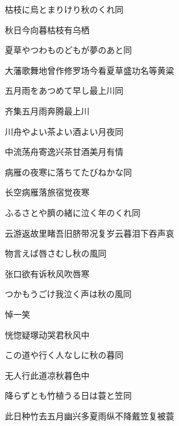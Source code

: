 \begin{haiku}
    {\FH 枯枝に烏とまりけり秋のくれ}\hfill{\FH 同}

    {\FK 秋日今向暮枯枝有乌栖}
\end{haiku}

\begin{haiku}
    {\FH 夏草やつわものどもが夢のあと}\hfill{\FH 同}

    {\FK 大藩歌舞地曾作修罗场今看夏草盛功名等黄粱}
\end{haiku}

\begin{haiku}
    {\FH 五月雨をあつめて早し最上川}\hfill{\FH 同}

    {\FK 齐集五月雨奔腾最上川}
\end{haiku}

\begin{haiku}
    {\FH 川舟やよい茶よい酒よい月夜}\hfill{\FH 同}

    {\FK 中流荡舟寄逸兴茶甘酒美月有情}
\end{haiku}

\begin{haiku}
    {\FH 病雁の夜寒に落ちてたびねかな}\hfill{\FH 同}

    {\FK 长空病雁落旅宿觉夜寒}
\end{haiku}

\begin{haiku}
    {\FH ふるさとや臍の緒に泣く年のくれ}\hfill{\FH 同}

    {\FK 云游返故里睹吾旧脐带况复岁云暮泪下吞声哀}
\end{haiku}

\begin{haiku}
    {\FH 物言えば唇さむし秋の風}\hfill{\FH 同}

    {\FK 张口欲有诉秋风吹唇寒}
\end{haiku}

\begin{haiku}
    {\FH つかもうごけ我泣く声は秋の風}\hfill{\FH 同}

    {\FK 悼一笑}

    {\FK 恍惚疑塚动哭君秋风中}
\end{haiku}

\begin{haiku}
    {\FH この道や行く人なしに秋の暮}\hfill{\FH 同}

    {\FK 无人行此道凉秋暮色中}
\end{haiku}

\begin{haiku}
    {\FH 降らずとも竹植うる日は蓑と笠}\hfill{\FH 同}

    {\FK 此日种竹去五月幽兴多夏雨纵不降戴笠复被蓑}
\end{haiku}


